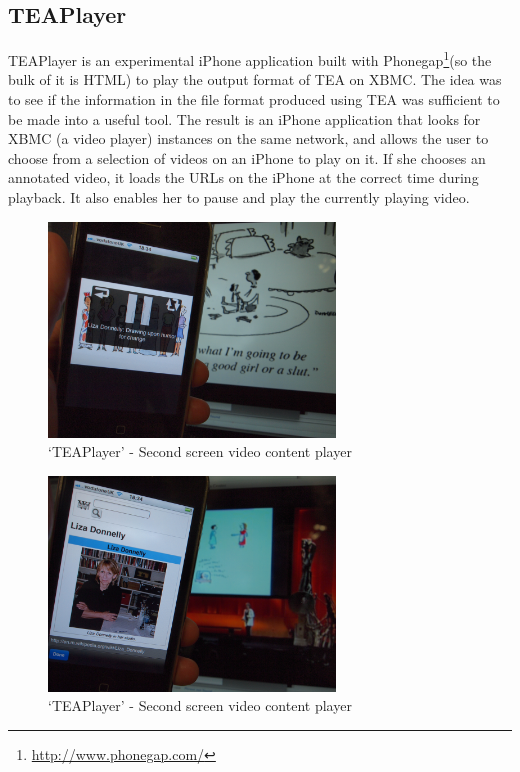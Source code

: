 \documentclass{notube}
\begin{document}
\subsection{TEAPlayer}

TEAPlayer is an experimental iPhone application built with Phonegap\footnote{\url{http://www.phonegap.com/}}(so the bulk of it is HTML) to play the output format of TEA on XBMC. The idea was to see if the information in the file format produced using TEA was sufficient to be made into a useful tool. The result is an iPhone application that looks for XBMC (a video player) instances on the same network, and allows the user to choose from a selection of videos on an iPhone to play on it. If she chooses an annotated video, it loads the URLs on the iPhone at the correct time during playback. It also enables her to pause and play the currently playing video.

\begin{figure}[htbp]
\begin{center}
\includegraphics[width=3in]{images/tea_player1.png}
\caption{`TEAPlayer' - Second screen video content player} \label{fig:teaplayer1}
\end{center}
\end{figure} 

\begin{figure}[htbp]
\begin{center}
\includegraphics[width=3in]{images/tea_player2.png}
\caption{`TEAPlayer' - Second screen video content player} \label{fig:teaplayer2}
\end{center}
\end{figure} 
\end{document}
